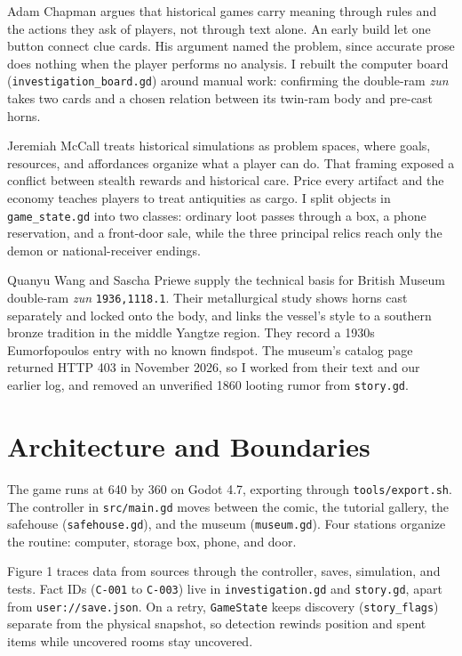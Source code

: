 \documentclass[11pt,a4paper]{article}
\begin{document}
Adam Chapman argues that historical games carry meaning through rules and the actions they ask of players, not through text alone.\autocite[opening discussion]{chapman2012} An early build let one button connect clue cards. His argument named the problem, since accurate prose does nothing when the player performs no analysis. I rebuilt the computer board (\texttt{investigation\_\allowbreak{}board.gd}) around manual work: confirming the double-ram \emph{zun} takes two cards and a chosen relation between its twin-ram body and pre-cast horns.

Jeremiah McCall treats historical simulations as problem spaces, where goals, resources, and affordances organize what a player can do.\autocite[part I]{mccall2012} That framing exposed a conflict between stealth rewards and historical care. Price every artifact and the economy teaches players to treat antiquities as cargo. I split objects in \texttt{game\_\allowbreak{}state.gd} into two classes: ordinary loot passes through a box, a phone reservation, and a front-door sale, while the three principal relics reach only the demon or national-receiver endings.

Quanyu Wang and Sascha Priewe supply the technical basis for British Museum double-ram \emph{zun} \texttt{1936,1118.1}. Their metallurgical study shows horns cast separately and locked onto the body, and links the vessel's style to a southern bronze tradition in the middle Yangtze region.\autocite[257--58, 266, 273]{wang2013} They record a 1930s Eumorfopoulos entry with no known findspot. The museum's catalog page returned HTTP 403 in November 2026, so I worked from their text and our earlier log, and removed an unverified 1860 looting rumor from \texttt{story.gd}.

\section{Architecture and Boundaries}
The game runs at 640 by 360 on Godot 4.7, exporting through \texttt{tools/\allowbreak{}export.sh}. The controller in \texttt{src/\allowbreak{}main.gd} moves between the comic, the tutorial gallery, the safehouse (\texttt{safehouse.gd}), and the museum (\texttt{museum.gd}). Four stations organize the routine: computer, storage box, phone, and door.

Figure 1 traces data from sources through the controller, saves, simulation, and tests. Fact IDs (\texttt{C-001} to \texttt{C-003}) live in \texttt{investigation.gd} and \texttt{story.gd}, apart from \texttt{user:/\allowbreak{}/\allowbreak{}save.json}. On a retry, \texttt{GameState} keeps discovery (\texttt{story\_\allowbreak{}flags}) separate from the physical snapshot, so detection rewinds position and spent items while uncovered rooms stay uncovered.
\end{document}
